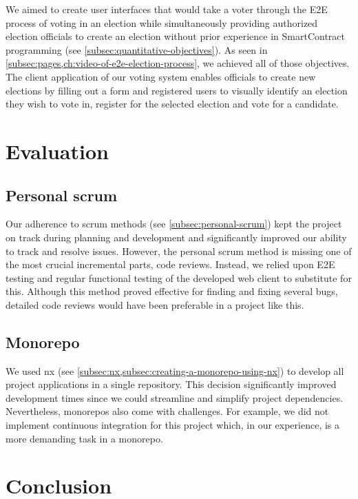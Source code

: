 We aimed to create user interfaces that would take a voter through the \gls{E2E} process of voting in an election while simultaneously providing authorized election officials to create an election without prior experience in \gls{SmartContract} programming (see \cref{subsec:quantitative-objectives}).
As seen in \cref{subsec:pages,ch:video-of-e2e-election-process}, we achieved all of those objectives.
The client application of our voting system enables officials to create new elections by filling out a form and registered users to visually identify an election they wish to vote in, register for the selected election and vote for a candidate.

\section{Evaluation}\label{sec:evalutaion}

\subsection{Personal scrum}\label{subsec:res-personal-scrum}

Our adherence to scrum methods (see \cref{subsec:personal-scrum}) kept the project on track during planning and development and significantly improved our ability to track and resolve issues.
However, the personal scrum method is missing one of the most crucial incremental parts, code reviews.
Instead, we relied upon \gls{E2E} testing and regular functional testing of the developed web client to substitute for this.
Although this method proved effective for finding and fixing several bugs, detailed code reviews would have been preferable in a project like this.

\subsection{Monorepo}\label{subsec:monorepo}

We used nx (see \cref{subsec:nx,subsec:creating-a-monorepo-using-nx}) to develop all project applications in a single repository.
This decision significantly improved development times since we could streamline and simplify project dependencies.
Nevertheless, monorepos also come with challenges.
For example, we did not implement continuous integration for this project which, in our experience, is a more demanding task in a monorepo.

\section{Conclusion}\label{sec:conclusion}

